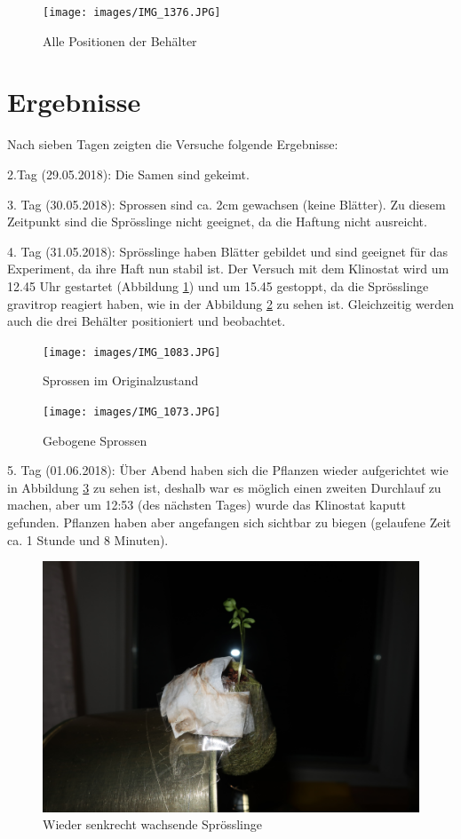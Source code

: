 \documentclass[
11pt, 
ngerman,
listof=totocnumbered,
oneside,
bibliography=totocnumbered,
abstracton
]{scrreprt}
\begin{document}
\begin{figure}[H]
	\centering 
	\texttt{[image: images/IMG\_1376.JPG]}
	\caption{Alle Positionen der Behälter}
\end{figure} 


\section{Ergebnisse}

Nach sieben Tagen zeigten die Versuche folgende Ergebnisse:

2.Tag (29.05.2018): Die Samen sind gekeimt. 

3. Tag (30.05.2018): Sprossen sind ca. 2cm gewachsen (keine Blätter).
Zu diesem Zeitpunkt sind die Sprösslinge nicht geeignet, da die Haftung nicht ausreicht. 

4. Tag (31.05.2018): Sprösslinge haben Blätter gebildet und sind geeignet für das Experiment, da ihre Haft nun stabil ist. Der Versuch mit dem Klinostat wird um 12.45 Uhr gestartet (Abbildung \ref{Foto 1}) und um 15.45 gestoppt, da die Sprösslinge gravitrop reagiert haben, wie in der Abbildung \ref{Foto 2} zu sehen ist. Gleichzeitig werden auch die drei Behälter positioniert und beobachtet.

\begin{figure}[H]
	  \centering 
	  \texttt{[image: images/IMG\_1083.JPG]}
	  \caption{Sprossen im Originalzustand \label{Foto 1}}
\end{figure}


\begin{figure}[H]
	  \centering 
	  \texttt{[image: images/IMG\_1073.JPG]}
	  \caption{Gebogene Sprossen \label{Foto 2}}
\end{figure}



5. Tag (01.06.2018): Über Abend haben sich die Pflanzen wieder aufgerichtet wie in Abbildung \ref{Foto 3} zu sehen ist, deshalb war es möglich einen zweiten Durchlauf zu machen, aber um 12:53 (des nächsten Tages) wurde das Klinostat kaputt gefunden. Pflanzen haben aber angefangen sich sichtbar zu biegen (gelaufene Zeit ca. 1 Stunde und 8 Minuten).

\begin{figure}[H]
	\centering 
	\includegraphics[width = .5\linewidth]{images/IMG_1114.JPG}
	\caption{Wieder senkrecht wachsende Sprösslinge \label{Foto 3}}
\end{figure}
\end{document}
